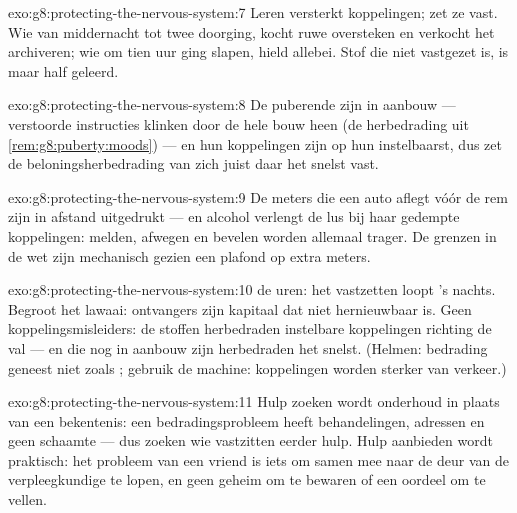 \begin{solution}{exo:g8:protecting-the-nervous-system:7}
Leren versterkt koppelingen;  zet ze vast. Wie van middernacht tot
twee doorging, kocht ruwe oversteken en verkocht het archiveren; wie om
tien uur ging slapen, hield allebei. Stof die niet vastgezet is, is
maar half geleerd.
\end{solution}

\begin{solution}{exo:g8:protecting-the-nervous-system:8}
De puberende  zijn in aanbouw --- verstoorde instructies klinken
door de hele bouw heen (de herbedrading uit
\cref{rem:g8:puberty:moods}) --- en hun koppelingen zijn op hun
instelbaarst, dus zet de beloningsherbedrading van  zich juist
daar het snelst vast.
\end{solution}

\begin{solution}{exo:g8:protecting-the-nervous-system:9}
De meters die een auto aflegt vóór de rem zijn  in afstand
uitgedrukt --- en alcohol verlengt de lus bij haar gedempte koppelingen:
melden, afwegen en bevelen worden allemaal trager. De grenzen in de wet
zijn mechanisch gezien een plafond op extra meters.
\end{solution}

\begin{solution}{exo:g8:protecting-the-nervous-system:10}
 de uren: het vastzetten loopt 's nachts. Begroot het lawaai:
ontvangers zijn kapitaal dat niet hernieuwbaar is. Geen
koppelingsmisleiders: de stoffen herbedraden instelbare koppelingen
richting de val --- en  die nog in aanbouw zijn herbedraden het
snelst. (Helmen: bedrading geneest niet zoals ; gebruik de machine:
koppelingen worden sterker van verkeer.)
\end{solution}

\begin{solution}{exo:g8:protecting-the-nervous-system:11}
Hulp zoeken wordt onderhoud in plaats van een bekentenis: een
bedradingsprobleem heeft behandelingen, adressen en geen schaamte --- dus
zoeken wie vastzitten eerder hulp. Hulp aanbieden wordt praktisch: het
probleem van een vriend is iets om samen mee naar de deur van de
verpleegkundige te lopen, en geen geheim om te bewaren of een oordeel om
te vellen.
\end{solution}

